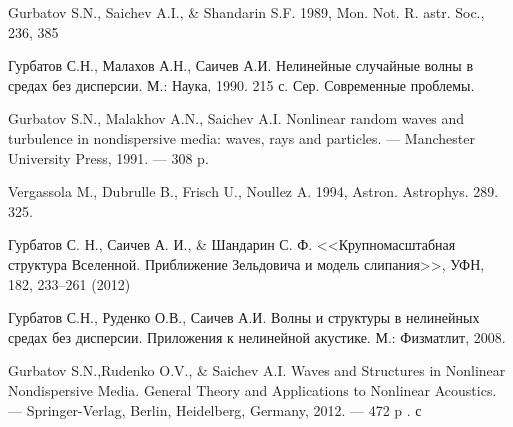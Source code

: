 \documentclass[a5paper,11pt]{extarticle}
\theoremstyle{definition}
\begin{document}
\begin{thebibliography}{99}
 Gurbatov S.N., Saichev A.I., \& Shandarin S.F. 1989, Mon. Not. R. astr. Soc., 236, 385

 Гурбатов С.Н., Малахов А.Н., Саичев А.И. Нелинейные случайные волны в средах без дисперсии. М.: Наука, 1990. 215 с. Сер. Современные проблемы.

 Gurbatov S.N., Malakhov A.N., Saichev A.I. Nonlinear random waves and turbulence in nondispersive media: waves, rays and particles. — Manchester University Press, 1991. — 308 p.

 Vergassola M., Dubrulle B., Frisch U., Noullez A. 1994, Astron. Astrophys. 289. 325.

 Гурбатов С. Н., Саичев А. И., \& Шандарин С. Ф.   <<Крупномасштабная структура Вселенной. Приближение Зельдовича и модель слипания>>,  УФН, 182,  233–261 (2012)

 Гурбатов С.Н., Руденко О.В., Саичев А.И. Волны и структуры в нелинейных средах без дисперсии. Приложения к нелинейной акустике. М.: Физматлит, 2008.

 Gurbatov S.N.,Rudenko O.V., \& Saichev A.I. Waves and Structures in Nonlinear Nondispersive Media. General Theory and Applications to Nonlinear Acoustics. — Springer-Verlag, Berlin, Heidelberg, Germany, 2012. — 472 p . с

\end{thebibliography}


\end{document}
